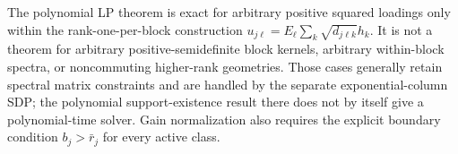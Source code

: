 The polynomial LP theorem is exact for arbitrary positive squared loadings only within the rank-one-per-block construction \(u_{j\ell}=E_\ell\sum_k\sqrt{d_{j\ell k}}h_k\). It is not a theorem for arbitrary positive-semidefinite block kernels, arbitrary within-block spectra, or noncommuting higher-rank geometries. Those cases generally retain spectral matrix constraints and are handled by the separate exponential-column SDP; the polynomial support-existence result there does not by itself give a polynomial-time solver. Gain normalization also requires the explicit boundary condition \(b_j>\bar r_j\) for every active class.